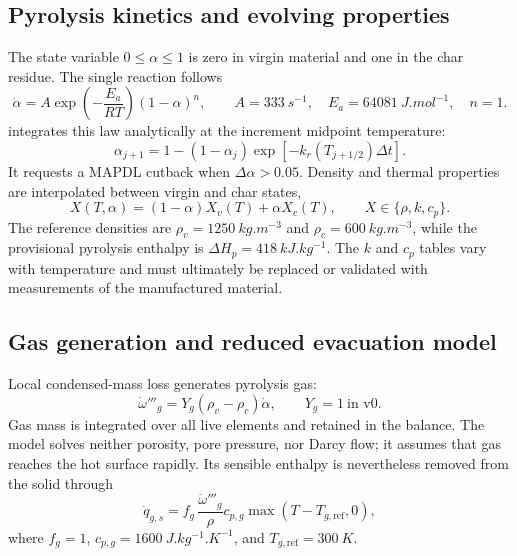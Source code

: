 \documentclass[oneside,openany]{amsdtx}
\begin{document}
\subsection{Pyrolysis kinetics and evolving properties}
The state variable \(0\leq\alpha\leq1\) is zero in virgin material and one in
the char residue. The single reaction follows
\begin{equation}
 \dot\alpha=A\exp\!\left(-\frac{E_a}{RT}\right)(1-\alpha)^n,
 \qquad
 A=\SI{333}{s^{-1}},\quad E_a=\SI{64081}{J.mol^{-1}},\quad n=1.
 \label{eq:v0-arrhenius}
\end{equation}
 integrates this law analytically at the increment midpoint
temperature:
\begin{equation}
 \alpha_{j+1}=1-(1-\alpha_j)\exp[-k_r(T_{j+1/2})\Delta t].
\end{equation}
It requests a MAPDL cutback when \(\Delta\alpha>0.05\). Density and thermal
properties are interpolated between virgin and char states,
\begin{equation}
 X(T,\alpha)=(1-\alpha)X_v(T)+\alpha X_c(T),
 \qquad X\in\{\rho,k,c_p\}.
 \label{eq:v0-mixture}
\end{equation}
The reference densities are \(\rho_v=\SI{1250}{kg.m^{-3}}\) and
\(\rho_c=\SI{600}{kg.m^{-3}}\), while the provisional pyrolysis enthalpy is
\(\Delta H_p=\SI{418}{kJ.kg^{-1}}\). The \(k\) and \(c_p\) tables vary with
temperature and must ultimately be replaced or validated with measurements of
the manufactured material.

\subsection{Gas generation and reduced evacuation model}
Local condensed-mass loss generates pyrolysis gas:
\begin{equation}
 \dot\omega'''_g=Y_g(\rho_v-\rho_c)\dot\alpha,
 \qquad Y_g=1\ \text{in v0}.
 \label{eq:v0-gas-source}
\end{equation}
Gas mass is integrated over all live elements and retained in the balance. The
model solves neither porosity, pore pressure, nor Darcy flow; it assumes that
gas reaches the hot surface rapidly. Its sensible enthalpy is nevertheless
removed from the solid through
\begin{equation}
 \dot q_{g,s}=f_g\,\frac{\dot\omega'''_g}{\rho}
 c_{p,g}\max(T-T_{g,\mathrm{ref}},0),
\end{equation}
where \(f_g=1\), \(c_{p,g}=\SI{1600}{J.kg^{-1}.K^{-1}}\), and
\(T_{g,\mathrm{ref}}=\SI{300}{K}\).
\end{document}
